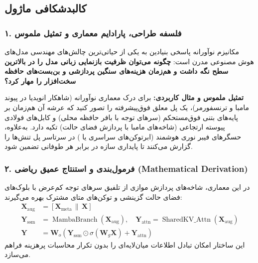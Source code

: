\subsection{کالبدشکافی ماژول }

\subsubsection*{۱. فلسفه طراحی، پارادایم معماری و تمثیل ملموس}
مکانیزم نوآورانه  پاسخی بنیادین به یکی از حیاتی‌ترین چالش‌های مهندسی مدل‌های هوش مصنوعی مدرن است: \textbf{چگونه می‌توان ظرفیت بازنمایی زبانی مدل را در بالاترین سطح نگه داشت و هم‌زمان هزینه‌های سنگین پردازشی و بن‌بست‌های حافظه سخت‌افزار را مهار کرد؟}

\textbf{تمثیل ملموس و مثال کاربردی:}
برای درک معماری نوآورانه  (شاهکار انویدیا در پیوند مامبا و ترنسفورمر)، یک پل معلق فوق‌پیشرفته را تصور کنید که عرشه آن هم‌زمان بر پایه‌های بتنی فوق‌مستحکم (سرهای توجه با بافر حافظه محلی) و کابل‌های فولادی پیوسته ارتجاعی (شاخه‌های مامبا با پردازش فضای حالت) تکیه دارد. به‌علاوه، حسگرهای فیبر نوری هوشمند (ابرتوکن‌های سراسری یا ) در سرتاسر پل تنش‌ها را گزارش می‌کنند تا پایداری سازه در برابر هر طوفانی تضمین شود.

\subsubsection*{۲. فرمول‌بندی و استنتاج عمیق ریاضی (Mathematical Derivation)}
در این معماری، شاخه‌های پردازش موازی از تلفیق سرهای توجه کم‌عرض با بلوک‌های فضای حالت گزینشی و توکن‌های متای مشترک بهره می‌گیرند:
\begin{align}
\mathbf{X}_{\text{aug}} &= [\mathbf{X}_{\text{meta}} \,\|\, \mathbf{X}] \\
\mathbf{Y}_{\text{ssm}} &= \operatorname{MambaBranch}(\mathbf{X}_{\text{aug}}), \quad \mathbf{Y}_{\text{attn}} = \operatorname{SharedKV\_Attn}(\mathbf{X}_{\text{aug}}) \\
\mathbf{Y} &= \mathbf{W}_o \left( \mathbf{Y}_{\text{ssm}} \odot \sigma(\mathbf{W}_g \mathbf{X}) + \mathbf{Y}_{\text{attn}} \right)
\end{align}
این ساختار امکان تبادل اطلاعات میان‌لایه‌ای را بدون تکرار محاسبات پرهزینه فراهم می‌سازد.

